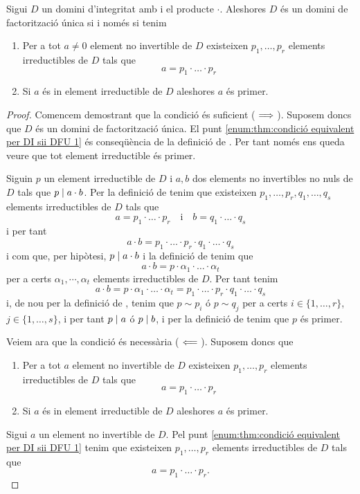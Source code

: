 \documentclass[../../Main.tex]{subfiles}
\begin{document}
	\begin{theorem}
		\label{thm:condició equivalent per DI sii DFU}
		Sigui \(D\) un domini d'integritat amb i el producte \(\cdot\). Aleshores \(D\) és un domini de factorització única si i només si tenim
		\begin{enumerate}
			\item\label{enum:thm:condició equivalent per DI sii DFU 1} Per a tot \(a\neq0\) element no invertible de \(D\) existeixen \(p_{1},\dots,p_{r}\) elements irreductibles de \(D\) tals que
			\[a=p_{1}\cdot\ldots\cdot p_{r}\]
			\item\label{enum:thm:condició equivalent per DI sii DFU 2} Si \(a\) és in element irreductible de \(D\) aleshores \(a\) és primer.
		\end{enumerate}
		\begin{proof}
			Comencem demostrant que la condició és suficient (\(\implies\)). Suposem doncs que \(D\) és un domini de factorització única. El punt \eqref{enum:thm:condició equivalent per DI sii DFU 1} és conseqüència de la definició de . Per tant només ens queda veure que tot element irreductible és primer.
			
			Siguin \(p\) un element irreductible de \(D\) i \(a,b\) dos elements no invertibles no nuls de \(D\) tals que \(p\mathrel{|} a\cdot b\). Per la definició de  tenim que existeixen \(p_{1},\dots,p_{r},q_{1},\dots,q_{s}\) elements irreductibles de \(D\) tals que
			\[a=p_{1}\cdot\ldots\cdot p_{r}\quad\text{i}\quad b=q_{1}\cdot\ldots\cdot q_{s}\]
			i per tant
			\[a\cdot b=p_{1}\cdot\ldots\cdot p_{r}\cdot q_{1}\cdot\ldots\cdot q_{s}\]
			i com que, per hipòtesi, \(p\mathrel{|} a\cdot b\) i la definició de  tenim que
			\[a\cdot b=p\cdot\alpha_{1}\cdot\ldots\cdot\alpha_{t}\]
			per a certs \(\alpha_{1},\cdots,\alpha_{t}\) elements irreductibles de \(D\). Per tant tenim
			\[a\cdot b=p\cdot\alpha_{1}\cdot\ldots\cdot\alpha_{t}=p_{1}\cdot\ldots\cdot p_{r}\cdot q_{1}\cdot\ldots\cdot q_{s}\]
			i, de nou per la definició de , tenim que \(p\sim p_{i}\) ó \(p\sim q_{j}\) per a certs \(i\in\{1,\dots,r\}\), \(j\in\{1,\dots,s\}\), i per tant \(p\mathrel{|} a\) ó \(p\mathrel{|} b\), i per la definició de  tenim que \(p\) és primer.
			
			Veiem ara que la condició és necessària (\(\impliedby\)). Suposem doncs que
			\begin{enumerate}
				\item Per a tot \(a\) element no invertible de \(D\) existeixen \(p_{1},\dots,p_{r}\) elements irreductibles de \(D\) tals que
				\[a=p_{1}\cdot\ldots\cdot p_{r}\]
				\item Si \(a\) és in element irreductible de \(D\) aleshores \(a\) és primer.
			\end{enumerate}
			Sigui \(a\) un element no invertible de \(D\). Pel punt \eqref{enum:thm:condició equivalent per DI sii DFU 1} tenim que existeixen \(p_{1},\dots,p_{r}\) elements irreductibles de \(D\) tals que
			\[a=p_{1}\cdot\ldots\cdot p_{r}.\]
			

\end{proof}
\end{theorem}
\end{document}
